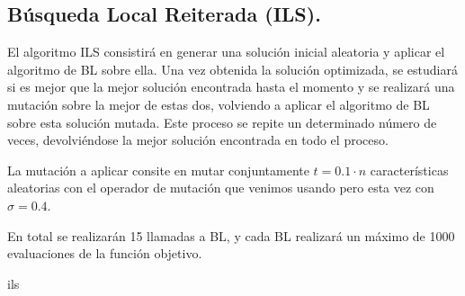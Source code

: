 \documentclass[11pt,a4paper]{article}
\theoremstyle{definition}
\begin{document}
	
	\subsection{Búsqueda Local Reiterada (ILS).}
	El algoritmo ILS consistirá en generar una solución inicial aleatoria y aplicar el
algoritmo de BL sobre ella. Una vez obtenida la solución optimizada, se estudiará si es
mejor que la mejor solución encontrada hasta el momento y se realizará una mutación
sobre la mejor de estas dos, volviendo a aplicar el algoritmo de BL sobre esta solución
mutada. Este proceso se repite un determinado número de veces, devolviéndose la mejor
solución encontrada en todo el proceso.

	La mutación a aplicar consite en mutar conjuntamente $t=0.1\cdot n$ características aleatorias con el operador de mutación que venimos usando pero esta vez con $\sigma=0.4$.
	
	En total se realizarán 15 llamadas a BL, y cada BL realizará un máximo de 1000 evaluaciones de la función objetivo.\\

	 
	 \begin{algorithm}[H]
		\caption{ils}
			
	\end{algorithm}
	
\end{document}
